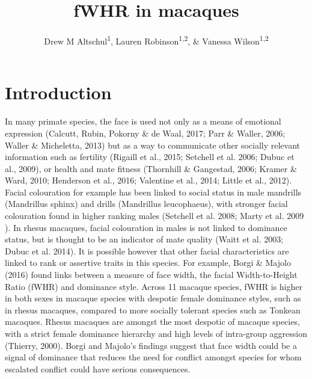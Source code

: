 \documentclass[english,man]{apa6}
\title{fWHR in macaques}
\author{Drew M Altschul\textsuperscript{1}, Lauren Robinson\textsuperscript{1,2}, \& Vanessa Wilson\textsuperscript{1,2}}
\affiliation{
    \vspace{0.5cm}
          \textsuperscript{1} The University of Edinburgh\\
          \textsuperscript{2} fuckin Disney World  }
\theoremstyle{definition}
\theoremstyle{definition}
\theoremstyle{remark}
\begin{document}
\maketitle

\setcounter{secnumdepth}{0}



\section{Introduction}\label{introduction}

In many primate species, the face is used not only as a means of
emotional expression (Calcutt, Rubin, Pokorny \& de Waal, 2017; Parr \&
Waller, 2006; Waller \& Micheletta, 2013) but as a way to communicate
other socially relevant information such as fertility (Rigaill et al.,
2015; Setchell et al. 2006; Dubuc et al., 2009), or health and mate
fitness (Thornhill \& Gangestad, 2006; Kramer \& Ward, 2010; Henderson
et al., 2016; Valentine et al., 2014; Little et al., 2012). Facial
colouration for example has been linked to social status in male
mandrills (Mandrillus sphinx) and drills (Mandrillus leucophaeus), with
stronger facial colouration found in higher ranking males (Setchell et
al. 2008; Marty et al. 2009 ). In rhesus macaques, facial colouration in
males is not linked to dominance status, but is thought to be an
indicator of mate quality (Waitt et al. 2003; Dubuc et al. 2014). It is
possible however that other facial characteristics are linked to rank or
assertive traits in this species. For example, Borgi \& Majolo (2016)
found links between a measure of face width, the facial Width-to-Height
Ratio (fWHR) and dominance style. Across 11 macaque species, fWHR is
higher in both sexes in macaque species with despotic female dominance
styles, such as in rhesus macaques, compared to more socially tolerant
species such as Tonkean macaques. Rhesus macaques are amongst the most
despotic of macaque species, with a strict female dominance hierarchy
and high levels of intra-group aggression (Thierry, 2000). Borgi and
Majolo's findings suggest that face width could be a signal of dominance
that reduces the need for conflict amongst species for whom escalated
conflict could have serious consequences.
\end{document}
